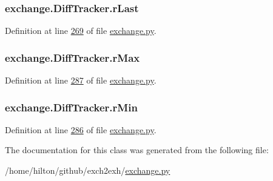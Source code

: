 \subsubsection[{\texorpdfstring{r\+Last}{rLast}}]{\setlength{\rightskip}{0pt plus 5cm}exchange.\+Diff\+Tracker.\+r\+Last}\hypertarget{classexchange_1_1_diff_tracker_a4dbaf0a1192448101cb35eca617c7f0f}{}\label{classexchange_1_1_diff_tracker_a4dbaf0a1192448101cb35eca617c7f0f}


Definition at line \hyperlink{exchange_8py_source_l00269}{269} of file \hyperlink{exchange_8py_source}{exchange.\+py}.

\subsubsection[{\texorpdfstring{r\+Max}{rMax}}]{\setlength{\rightskip}{0pt plus 5cm}exchange.\+Diff\+Tracker.\+r\+Max}\hypertarget{classexchange_1_1_diff_tracker_ab4266c6d4fc968997e26044a7c827980}{}\label{classexchange_1_1_diff_tracker_ab4266c6d4fc968997e26044a7c827980}


Definition at line \hyperlink{exchange_8py_source_l00287}{287} of file \hyperlink{exchange_8py_source}{exchange.\+py}.

\subsubsection[{\texorpdfstring{r\+Min}{rMin}}]{\setlength{\rightskip}{0pt plus 5cm}exchange.\+Diff\+Tracker.\+r\+Min}\hypertarget{classexchange_1_1_diff_tracker_ad3250cb94933244444942dec9199d362}{}\label{classexchange_1_1_diff_tracker_ad3250cb94933244444942dec9199d362}


Definition at line \hyperlink{exchange_8py_source_l00286}{286} of file \hyperlink{exchange_8py_source}{exchange.\+py}.



The documentation for this class was generated from the following file\+:\begin{DoxyCompactItemize}
\item 
/home/hilton/github/exch2exh/\hyperlink{exchange_8py}{exchange.\+py}\end{DoxyCompactItemize}
